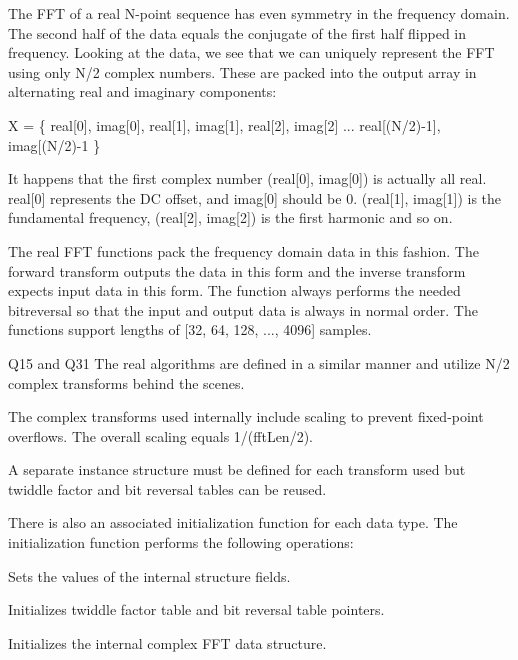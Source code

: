 \begin{DoxyParagraph}{}
The F\+FT of a real N-\/point sequence has even symmetry in the frequency domain. The second half of the data equals the conjugate of the first half flipped in frequency. Looking at the data, we see that we can uniquely represent the F\+FT using only N/2 complex numbers. These are packed into the output array in alternating real and imaginary components\+: 
\end{DoxyParagraph}
\begin{DoxyParagraph}{}
X = \{ real\mbox{[}0\mbox{]}, imag\mbox{[}0\mbox{]}, real\mbox{[}1\mbox{]}, imag\mbox{[}1\mbox{]}, real\mbox{[}2\mbox{]}, imag\mbox{[}2\mbox{]} ... real\mbox{[}(N/2)-\/1\mbox{]}, imag\mbox{[}(N/2)-\/1 \} 
\end{DoxyParagraph}
\begin{DoxyParagraph}{}
It happens that the first complex number (real\mbox{[}0\mbox{]}, imag\mbox{[}0\mbox{]}) is actually all real. real\mbox{[}0\mbox{]} represents the DC offset, and imag\mbox{[}0\mbox{]} should be 0. (real\mbox{[}1\mbox{]}, imag\mbox{[}1\mbox{]}) is the fundamental frequency, (real\mbox{[}2\mbox{]}, imag\mbox{[}2\mbox{]}) is the first harmonic and so on. 
\end{DoxyParagraph}
\begin{DoxyParagraph}{}
The real F\+FT functions pack the frequency domain data in this fashion. The forward transform outputs the data in this form and the inverse transform expects input data in this form. The function always performs the needed bitreversal so that the input and output data is always in normal order. The functions support lengths of \mbox{[}32, 64, 128, ..., 4096\mbox{]} samples. 
\end{DoxyParagraph}
\begin{DoxyParagraph}{Q15 and Q31}
The real algorithms are defined in a similar manner and utilize N/2 complex transforms behind the scenes. 
\end{DoxyParagraph}
\begin{DoxyParagraph}{}
The complex transforms used internally include scaling to prevent fixed-\/point overflows. The overall scaling equals 1/(fft\+Len/2). 
\end{DoxyParagraph}
\begin{DoxyParagraph}{}
A separate instance structure must be defined for each transform used but twiddle factor and bit reversal tables can be reused. 
\end{DoxyParagraph}
\begin{DoxyParagraph}{}
There is also an associated initialization function for each data type. The initialization function performs the following operations\+:
\begin{DoxyItemize}
\item Sets the values of the internal structure fields.
\item Initializes twiddle factor table and bit reversal table pointers.
\item Initializes the internal complex F\+FT data structure. 
\end{DoxyItemize}
\end{DoxyParagraph}
